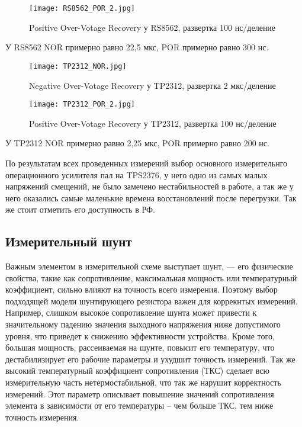 \begin{figure}[H]
\centering
\texttt{[image: RS8562\_POR\_2.jpg]}
\caption{Positive Over-Votage Recovery у RS8562, развертка 100 нс/деление}
\label{ris:424}
\end{figure}

У RS8562 NOR примерно равно 22,5 мкс, 
POR примерно равно 300 нс.

\begin{figure}[H]
\centering
\texttt{[image: TP2312\_NOR.jpg]}
\caption{Negative Over-Votage Recovery у TP2312, развертка 2 мкс/деление}
\label{ris:425}
\end{figure}

\begin{figure}[H]
\centering
\texttt{[image: TP2312\_POR\_2.jpg]}
\caption{Positive Over-Votage Recovery у TP2312, развертка 100 нс/деление}
\label{ris:426}
\end{figure}

У TP2312 NOR примерно равно 2,25 мкс,
POR примерно равно 200 нс.

По результатам всех проведенных измерений выбор основного измерительнго операционного усилителя пал на 
TPS2376, у него одно из самых малых напряжений смещений, не было замечено нестабильностей в работе, 
а так же у него оказались самые маленькие времена восстановлений после перегрузки. Так же стоит отметить 
его доступность в РФ.

\subsection{Измерительный шунт}
\hspace{1cm} 

Важным элементом в измерительной схеме выступает шунт, — его физические свойства, 
такие как сопротивление, максимальная мощность или температурный коэффициент, 
сильно влияют на точность всего измерения. Поэтому выбор подходящей модели шунтирующего резистора 
важен для коррекнтых измерений. Например, слишком высокое сопротивление шунта может привести к 
значительному падению значения выходного напряжения ниже допустимого уровня, что приведет к снижению 
эффективности устройства. Кроме того, большая мощность, рассеиваемая на шунте, повысит его температуру, 
что дестабилизирует его рабочие параметры и ухудшит точность измерений. Так же высокий температурный 
коэффициент сопротивления (ТКС) сделает всю измерительную часть нетермостабильной, что так же нарушит 
корректность измерений. Этот параметр описывает повышение значений сопротивления элемента в зависимости от
его температуры -- чем больше ТКС, тем ниже точность измерения.

